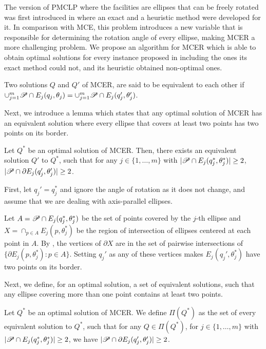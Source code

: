The version of PMCLP where the facilities are ellipses that can be freely rotated was first introduced in \cite{andreta} where an exact and a heuristic method were developed for it. In comparison with MCE, this problem introduces a new variable that is responsible for determining the rotation angle of every ellipse, making MCER a more challenging problem. We propose an algorithm for MCER which is able to obtain optimal solutions for every instance proposed in \cite{andreta} including the ones its exact method could not, and its heuristic obtained non-optimal ones.

\begin{definition}
	Two solutions $Q$ and $Q'$ of MCER, are said to be equivalent to each other if \mbox{$\cup_{j=1}^m \mathscr{P} \cap E_j(q_j, \theta_j) = \cup_{j=1}^m \mathscr{P} \cap E_j(q_j', \theta_j')$}.
\end{definition}

Next, we introduce a lemma which states that any optimal solution of MCER has an equivalent solution where every ellipse that covers at least two points has two points on its border.

\begin{lem}\label{lema:mce_2b}
	Let $Q^*$ be an optimal solution of MCER. 
	Then, there exists an equivalent solution $Q'$ to $Q^*$, such that for any $j\in\{1, \dots, m\}$ with $|\mathscr{P} \cap E_j(q_j^*, \theta_j^*)|\ge2$, $|\mathscr{P} \cap \partial E_j(q_j', \theta_j')|\ge 2$.
\end{lem}

\begin{pf}
	First, let $q_j'=q_j^*$ and ignore the angle of rotation as it does not change, and assume that we are dealing with axis-parallel ellipses.
	
	Let $A=\mathscr{P} \cap E_j(q_j^*, \theta_j^*)$ be the set of points covered by the $j$-th ellipse and $X=\cap_{p \in A}E_j(p, \theta_j^*)$ be the region of intersection of ellipses centered at each point in $A$. By \cite{bi}, the vertices of $\partial X$ are in the set of pairwise intersections of $\{\partial E_j(p, \theta_j^*)\colon p \in A\}$. Setting $q_j'$ as any of these vertices makes $E_j(q_j', \theta_j^*)$ have two points on its border.	
\end{pf}

Next, we define, for an optimal solution, a set of equivalent solutions, such that any ellipse covering more than one point contains at least two points.

\begin{definition}
	Let $Q^*$ be an optimal solution of MCER. We define $\Pi(Q^*)$ as the set of every equivalent solution to $Q^*$, such that for any $Q \in\Pi(Q^*)$, for $j\in\{1, \dots, m\}$ with $|\mathscr{P} \cap E_j(q_j^*, \theta_j^*)|\ge2$, we have $|\mathscr{P} \cap \partial E_j(q_j', \theta_j')| \ge 2$.
\end{definition}

